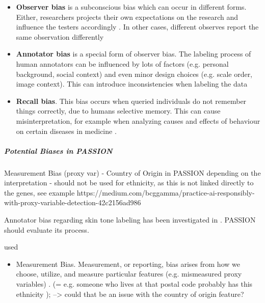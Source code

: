 \begin{refsection}
\begin{itemize}
			\item \textbf{Observer bias} is a subconscious bias which can occur in different forms. Either, researchers projects their own expectations on the research and influence the testers accordingly \autocite{Mester_2022}. In other cases, different observes report the same observation differently \autocite{Chakraborty_2024, c29, c26}
			
			\item \textbf{Annotator bias} is a special form of observer bias. The labeling process of human annotators can be influenced by lots of factors (e.g. personal background, social context) and even minor design choices (e.g. scale order, image context). This can introduce inconsistencies when labeling the data \autocite{Montoya_2025}
			
			\item \textbf{Recall bias}. This bias occurs when queried individuals do not remember things correctly, due to humans selective memory. This can cause misinterpretation, for example when analyzing causes and effects of behaviour on certain diseases in medicine \autocites{Mester_2022}{Chakraborty_2024, c3-6, c2}.
		\end{itemize}
		
		\subparagraph{Potential Biases in PASSION}
		Measurement Bias (proxy var) - Country of Origin in PASSION depending on the interpretation - should not be used for ethnicity, as this is not linked directly to the genes, see example https://medium.com/bcggamma/practice-ai-responsibly-with-proxy-variable-detection-42c2156ad986
		
		Annotator bias regarding skin tone labeling has been investigated in \autocite{Montoya_2025}. PASSION should evaluate its process.
		
		
		\rawcitationstart
		used
		\begin{itemize}		
			\rawcitationusedstart
			\item Measurement Bias. Measurement, or reporting, bias arises from how we choose, utilize, and measure particular features \autocite{M144_Suresh_2021} (e.g. mismeasured proxy variables) \autocite{Mehrabi_2021}. (= e.g. someone who lives at that postal code probably has this ethnicity ); --> could that be an issue with the country of origin feature?
			

\end{itemize}
\end{refsection}
